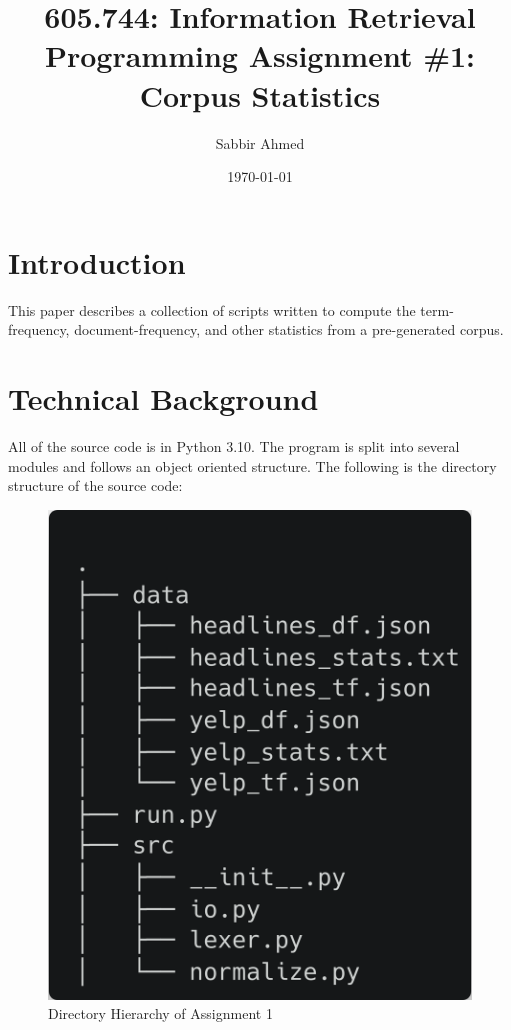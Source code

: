 \documentclass[11pt]{article}
\title{605.744: Information Retrieval \\ Programming Assignment \#1: Corpus Statistics}
\author{Sabbir Ahmed}
\date{\today}
\begin{document}
\maketitle	

\section{Introduction}
This paper describes a collection of scripts written to compute the term-frequency, document-frequency, and other statistics from a pre-generated corpus.

\section{Technical Background}
All of the source code is in Python 3.10. The program is split into several modules and follows an object oriented structure. The following is the directory structure of the source code:

\begin{figure}[!ht]
    \caption{Directory Hierarchy of Assignment 1}
    \centering
    \includegraphics[scale=0.2]{statics/dirtree.png}
\end{figure}
\end{document}
